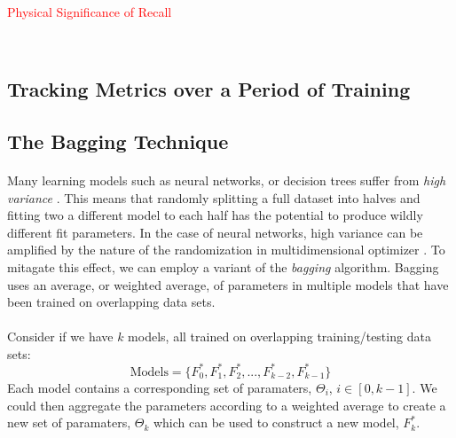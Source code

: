 \documentclass[12pt,letterpaper]{article}
\begin{document}
\paragraph*{}
\textcolor{red}{Physical Significance of Recall}


\


\subsection{Tracking Metrics over a Period of Training}
\label{subsec-TrainingMetrics}



\subsection{The Bagging Technique}
\label{subsec-Bagging}

\paragraph*{}Many learning models such as neural networks, or decision trees suffer from \textit{high variance} \cite{James}. This means that randomly splitting a full dataset into halves and fitting two a different model to each half has the potential to produce wildly different fit parameters. In the case of neural networks, high variance can be amplified by the nature of the randomization in multidimensional optimizer \cite{Geron}. To mitagate this effect, we can employ a variant of the \textit{bagging} algorithm. Bagging uses an average, or weighted average, of parameters in multiple models that have been trained on overlapping data sets.

\paragraph*{}Consider if we have $k$ models, all trained on overlapping training/testing data sets:
\begin{equation}
\text{Models} = \Big\{ F^*_{0} , F^*_{1} , F^*_{2} , ... , F^*_{k-2} , F^*_{k-1} \Big\}
\end{equation}
Each model contains a corresponding set of paramaters, $\Theta_{i}$, $i \in [0,k-1]$.
We could then aggregate the parameters according to a weighted average to create a new set of paramaters, $\Theta_{k}$ which can be used to construct a new model, $F^*_{k}$.
\end{document}
